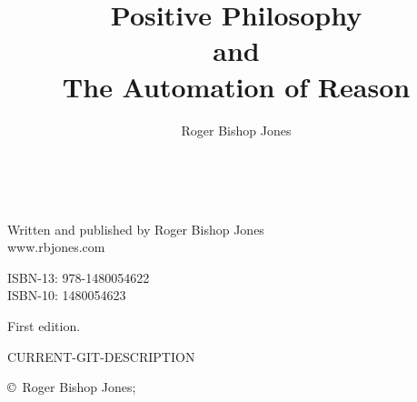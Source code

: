 \documentclass[10pt,titlepage]{book}
\title{Positive Philosophy\\ and\\ The Automation of Reason}
\author{Roger Bishop Jones}
\date{\ }
\begin{document}
\frontmatter

\begin{titlepage}
\maketitle


\hspace{2in}

\vfill

\begin{centering}

Written and published by Roger Bishop Jones\\
www.rbjones.com\\
\vspace{0.2in}

ISBN-13: 978-1480054622\\
ISBN-10: 1480054623

\vspace{0.2in}

{\footnotesize

First edition.

\vspace{0.2in}

\tiny{CURRENT-GIT-DESCRIPTION}

\vspace{0.2in}

\copyright\ Roger Bishop Jones;

}%

\end{centering}

\thispagestyle{empty}

\end{titlepage}
\end{document}
